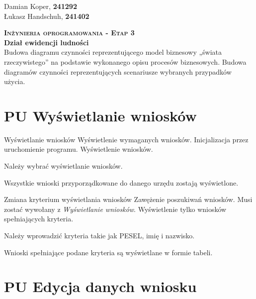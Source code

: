\documentclass[12pt]{article}
\begin{document}
\begin{flushleft}
        Damian Koper, \textbf{241292} \\
        Łukasz Handschuh, \textbf{241402}
\end{flushleft}
\vspace{1cm}
{
    \centering
    {\Huge\scshape\bfseries Inżynieria oprogramowania - Etap 3 }\\
    \vspace{0.25cm}
    \Large\textbf{Dział ewidencji ludności} \\
    \vspace{0.25cm}
    \large Budowa diagramu czynności reprezentującego model
    biznesowy „świata rzeczywistego” na podstawie
    wykonanego opisu procesów biznesowych. Budowa
    diagramów czynności reprezentujących scenariusze
    wybranych przypadków użycia.\\
}

\section{PU Wyświetlanie wniosków}
\scenario
    {Wyświetlanie wniosków}
    {Wyświetlenie wymaganych wniosków.}
    {Inicjalizacja przez uruchomienie programu.}
    {Wyświetlenie wniosków.}
    {
        \item Należy wybrać wyświetlanie wniosków.
        \item Wszystkie wnioski przyporządkowane do danego urzędu zostają wyświetlone.
    }
\scenario
    {Zmiana kryterium wyświetlania wniosków}
    {Zawężenie poszukiwań wniosków.}
    {Musi zostać wywołany z \textit{Wyświetlanie wniosków}.}
    {Wyświetlenie tylko wniosków spełniających kryteria.}
    {
        \item Należy wprowadzić kryteria takie jak PESEL, imię i nazwisko.
        \item Wnioski spełniające podane kryteria są wyświetlane w formie tabeli.
    }

\section{PU Edycja danych wniosku}
\end{document}
